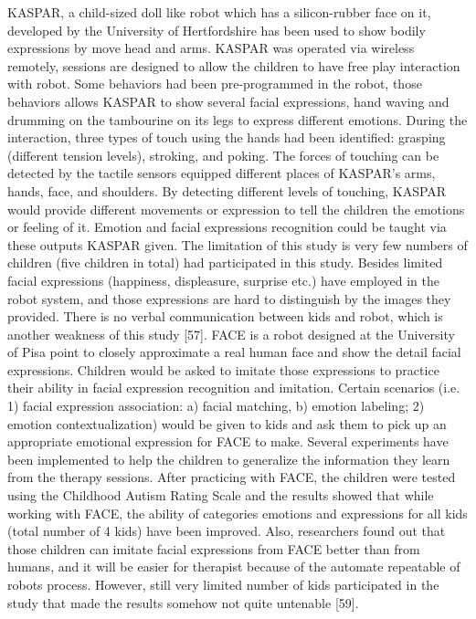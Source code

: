 KASPAR, a child-sized doll like robot which has a silicon-rubber face on it, developed by the University of Hertfordshire has been used to show bodily expressions by move head and arms. KASPAR was operated via wireless remotely, sessions are designed to allow the children to have free play interaction with robot. Some behaviors had been pre-programmed in the robot, those behaviors allows KASPAR to show several facial expressions, hand waving and drumming on the tambourine on its legs to express different emotions. During the interaction, three types of touch using the hands had been identified: grasping (different tension levels), stroking, and poking. The forces of touching can be detected by the tactile sensors equipped different places of KASPAR’s arms, hands, face, and shoulders. By detecting different levels of touching, KASPAR would provide different movements or expression to tell the children the emotions or feeling of it. Emotion and facial expressions recognition could be taught via these outputs KASPAR given. The limitation of this study is very few numbers of children (five children in total) had participated in this study. Besides limited facial expressions (happiness, displeasure, surprise etc.) have employed in the robot system, and those expressions are hard to distinguish by the images they provided. There is no verbal communication between kids and robot, which is another weakness of this study [57]. FACE is a robot designed at the University of Pisa point to closely approximate a real human face and show the detail facial expressions. Children would be asked to imitate those expressions to practice their ability in facial expression recognition and imitation. Certain scenarios (i.e. 1) facial expression association: a) facial matching, b) emotion labeling; 2) emotion contextualization) would be given to kids and ask them to pick up an appropriate emotional expression for FACE to make. Several experiments have been implemented to help the children to generalize the information they learn from the therapy sessions. After practicing with FACE, the children were tested using the Childhood Autism Rating Scale and the results showed that while working with FACE, the ability of categories emotions and expressions for all kids (total number of 4 kids) have been improved. Also, researchers found out that those children can imitate facial expressions from FACE better than from humans, and it will be easier for therapist because of the automate repeatable of robots process. However, still very limited number of kids participated in the study that made the results somehow not quite untenable [59].
